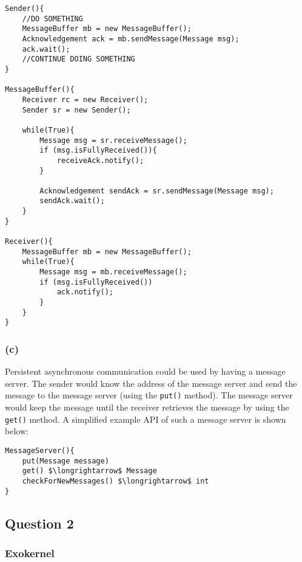 \documentclass[12pt,a4paper,fleqn]{article}
\begin{document}
\begin{lstlisting}[basicstyle=\footnotesize,breaklines=true]
Sender(){
	//DO SOMETHING
	MessageBuffer mb = new MessageBuffer();
	Acknowledgement ack = mb.sendMessage(Message msg);
	ack.wait();
	//CONTINUE DOING SOMETHING
}

MessageBuffer(){
	Receiver rc = new Receiver();
	Sender sr = new Sender();
	
	while(True){
		Message msg = sr.receiveMessage();
		if (msg.isFullyReceived()){
			receiveAck.notify();
		}
		
		Acknowledgement sendAck = sr.sendMessage(Message msg);
		sendAck.wait();
	}
}

Receiver(){
	MessageBuffer mb = new MessageBuffer();
	while(True){
		Message msg = mb.receiveMessage();
		if (msg.isFullyReceived())
			ack.notify();
		}
	}
}
\end{lstlisting}

\subsubsection*{(c)}
Persistent asynchronous communication could be used by having a message server. The sender would know the address of the message server and send the message to the message server (using the \texttt{put()} method). The message server would keep the message until the receiver retrieves the message by using the \texttt{get()} method. A simplified example API of such a message server is shown below:

\begin{lstlisting}[basicstyle=\footnotesize,breaklines=true,mathescape]
MessageServer(){
    put(Message message)
    get() $\longrightarrow$ Message
    checkForNewMessages() $\longrightarrow$ int
}
\end{lstlisting}


\subsection*{Question 2}
\label{sec:eq2}
\subsubsection*{Exokernel}
\end{document}
